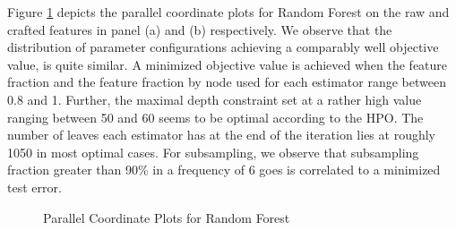 Figure \ref{fig:RF_ParallelPlot} depicts the parallel coordinate plots for Random Forest on the raw and crafted features in panel (a) and (b) respectively. We observe that the distribution of parameter configurations achieving a comparably well objective value, is quite similar. A minimized objective value is achieved when the feature fraction and the feature fraction by node used for each estimator range between 0.8 and 1. Further, the maximal depth constraint set at a rather high value ranging between 50 and 60 seems to be optimal according to the HPO. The number of leaves each estimator has at the end of the iteration lies at roughly 1050 in most optimal cases. For subsampling, we observe that subsampling fraction greater than 90\% in a frequency of 6 goes is correlated to a minimized test error.
\begin{figure}[h]
	\centering
	\caption{Parallel Coordinate Plots for Random Forest}
	\label{fig:RF_ParallelPlot}
\end{figure}

